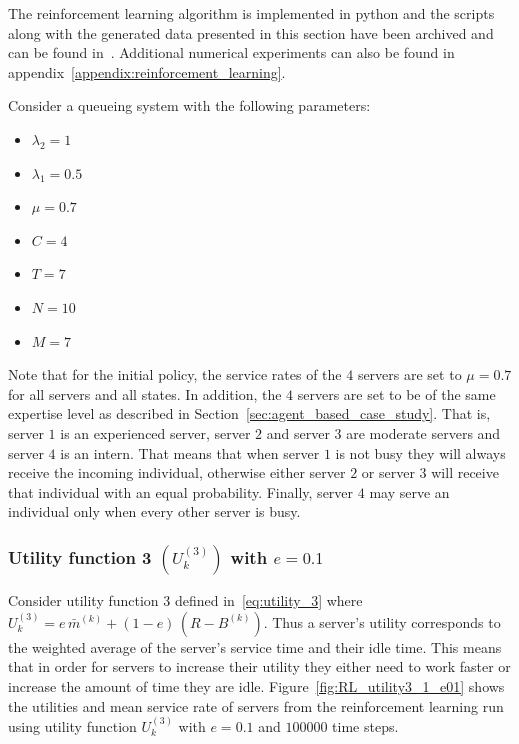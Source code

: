The reinforcement learning algorithm is implemented in python and the scripts
along with the generated data presented in this section have been archived and
can be found in~\cite{michalis_panayides_2023_7586860}.
Additional numerical experiments can also be found in
appendix~\ref{appendix:reinforcement_learning}.

Consider a queueing system with the following parameters:

\begin{multicols}{4}
    \begin{itemize}
        \item \(\lambda_2 = 1\)
        \item \(\lambda_1 = 0.5 \)
        \item \(\mu = 0.7\)
        \item \(C = 4\)
        \item \(T = 7\)
        \item \(N = 10\)
        \item \(M = 7 \)
    \end{itemize}
\end{multicols}

Note that for the initial policy, the service rates of the \(4\) servers are
set to \(\mu = 0.7\) for all servers and all states.
In addition, the \(4\) servers are set to be of the same expertise level as
described in Section~\ref{sec:agent_based_case_study}.
That is, server \(1\) is an experienced server, server \(2\) and server
\(3\) are moderate servers and server \(4\) is an intern.
That means that when server \(1\) is not busy they will always receive the
incoming individual, otherwise either server \(2\) or server \(3\) will
receive that individual with an equal probability.
Finally, server \(4\) may serve an individual only when every other server is
busy.


\subsubsection{Utility function 3 \((U_k^{(3)})\) with \(e = 0.1\)}
\label{sec:utility_3_results}

Consider utility function 3 defined in~\eqref{eq:utility_3} where
\(U_k^{(3)} = e \, \bar{m}^{(k)} + (1 - e) \, (R - B^{(k)})\).
Thus a server's utility corresponds to the weighted average of the server's
service time and their idle time.
This means that in order for servers to increase their utility they either
need to work faster or increase the amount of time they are idle.
Figure~\ref{fig:RL_utility3_1_e01} shows the utilities and mean service rate
of servers from the reinforcement learning run using utility function
\(U_k^{(3)}\) with \(e = 0.1\) and \(100000\) time steps.

